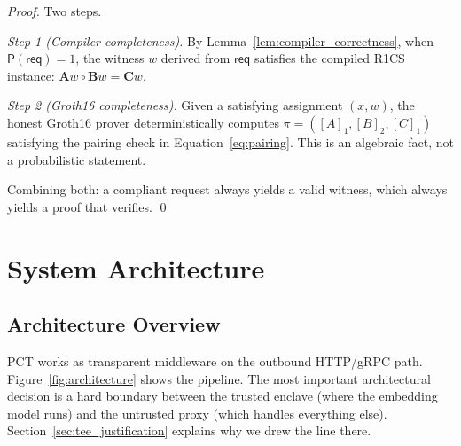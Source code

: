 \documentclass[10pt,conference]{IEEEtran}
\begin{document}
\begin{proof}
Two steps.

\emph{Step 1 (Compiler completeness).} By Lemma~\ref{lem:compiler_correctness}, when $\mathsf{P}(\mathsf{req}) = 1$, the witness $w$ derived from $\mathsf{req}$ satisfies the compiled R1CS instance: $\mathbf{A}w \circ \mathbf{B}w = \mathbf{C}w$.

\emph{Step 2 (Groth16 completeness).} Given a satisfying assignment $(x, w)$, the honest Groth16 prover deterministically computes $\pi = ([A]_1, [B]_2, [C]_1)$ satisfying the pairing check in Equation~\ref{eq:pairing}. This is an algebraic fact, not a probabilistic statement.

Combining both: a compliant request always yields a valid witness, which always yields a proof that verifies. \qed
\end{proof}

\section{System Architecture}
\label{sec:architecture}

\subsection{Architecture Overview}

PCT works as transparent middleware on the outbound HTTP/gRPC path. Figure~\ref{fig:architecture} shows the pipeline. The most important architectural decision is a hard boundary between the trusted enclave (where the embedding model runs) and the untrusted proxy (which handles everything else). Section~\ref{sec:tee_justification} explains why we drew the line there.
\end{document}
